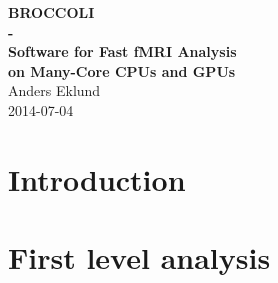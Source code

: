 \documentclass[11pt,a4paper,swedish]{book}
\makeatletter
\def\cleardoublepage{\clearpage\if@twoside \ifodd\c@page\else
\hbox{}
\thispagestyle{empty}     
\newpage 
\if@twocolumn\hbox{}\newpage\fi\fi\fi}
\makeatother
\begin{document}



\thispagestyle{empty}
\makeatletter
\begin{center}
  {\huge \textbf{BROCCOLI \\ - \\ Software for Fast fMRI Analysis \\ on Many-Core CPUs and GPUs}}\\[1 cm]
  {\Large Anders Eklund}\\[1.5 cm]
  {\Large 2014-07-04}\\[1.5 cm]
\end{center}


\renewcommand{\contentsname}{Table of Contents}
\tableofcontents



%


\chapter{Introduction}
\label{sec:intro}


\cleardoublepage
\newpage
\chapter{First level analysis}
\label{sec:firstlevel}


\cleardoublepage
\newpage
%

\cleardoublepage
\newpage
%

\cleardoublepage
\newpage
%
\end{document}
